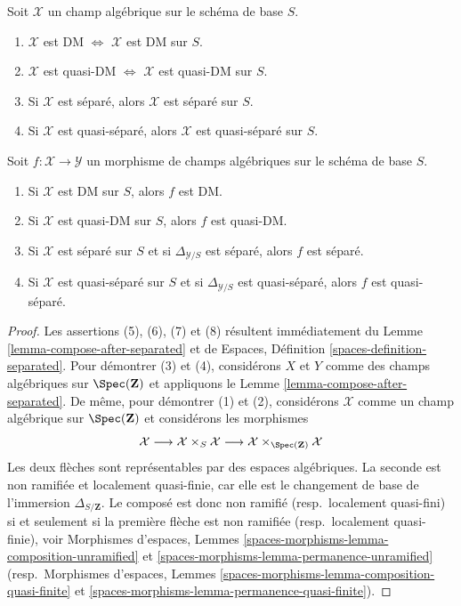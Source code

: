 \begin{lemma}
\label{lemma-separated-implies-morphism-separated}
Soit $\mathcal{X}$ un champ algébrique sur le schéma de base $S$.
\begin{enumerate}
\item
$\mathcal{X}$ est DM $\Leftrightarrow$
$\mathcal{X}$ est DM sur $S$.
\item
$\mathcal{X}$ est quasi-DM $\Leftrightarrow$
$\mathcal{X}$ est quasi-DM sur $S$.
\item Si $\mathcal{X}$ est séparé, alors $\mathcal{X}$ est séparé sur $S$.
\item Si $\mathcal{X}$ est quasi-séparé, alors $\mathcal{X}$ est quasi-séparé
sur $S$.
\end{enumerate}
Soit $f : \mathcal{X} \to \mathcal{Y}$ un morphisme de champs algébriques
sur le schéma de base $S$.
\begin{enumerate}
\item[(5)] Si $\mathcal{X}$ est DM sur $S$, alors $f$ est DM.
\item[(6)] Si $\mathcal{X}$ est quasi-DM sur $S$, alors $f$ est quasi-DM.
\item[(7)] Si $\mathcal{X}$ est séparé sur $S$ et si
$\Delta_{\mathcal{Y}/S}$ est séparé, alors $f$ est séparé.
\item[(8)] Si $\mathcal{X}$ est quasi-séparé sur $S$ et si
$\Delta_{\mathcal{Y}/S}$ est quasi-séparé, alors $f$ est quasi-séparé.
\end{enumerate}
\end{lemma}

\begin{proof}
Les assertions (5), (6), (7) et (8) résultent immédiatement du Lemme
\ref{lemma-compose-after-separated} et de Espaces, Définition
\ref{spaces-definition-separated}. Pour démontrer (3) et (4), considérons
$X$ et $Y$ comme des champs algébriques sur
$\Spec(\mathbf{Z})$ et appliquons le Lemme
\ref{lemma-compose-after-separated}. De même, pour démontrer (1) et (2),
considérons $\mathcal{X}$ comme un champ algébrique sur
$\Spec(\mathbf{Z})$ et considérons les morphismes
$$
\mathcal{X} \longrightarrow
\mathcal{X} \times_S \mathcal{X} \longrightarrow
\mathcal{X} \times_{\Spec(\mathbf{Z})} \mathcal{X}
$$
Les deux flèches sont représentables par des espaces algébriques. La seconde
est non ramifiée et localement quasi-finie, car elle est le changement de base
de l'immersion $\Delta_{S/\mathbf{Z}}$. Le composé est donc non ramifié
(resp.\ localement quasi-fini) si et seulement si la première flèche est non
ramifiée (resp.\ localement quasi-finie), voir Morphismes d'espaces, Lemmes
\ref{spaces-morphisms-lemma-composition-unramified} et
\ref{spaces-morphisms-lemma-permanence-unramified}
(resp.\ Morphismes d'espaces, Lemmes
\ref{spaces-morphisms-lemma-composition-quasi-finite} et
\ref{spaces-morphisms-lemma-permanence-quasi-finite}).
\end{proof}

